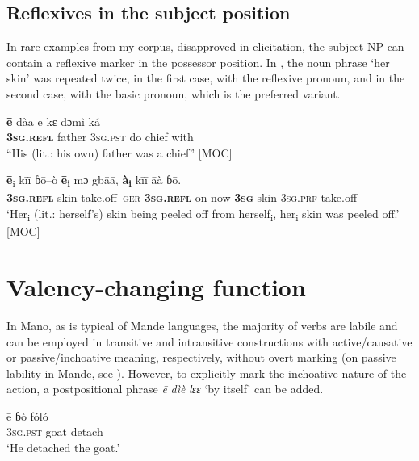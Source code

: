 \documentclass[output=paper]{langscibook}
\begin{document}
 
 \subsection{Reflexives in the subject position}\label{sec:Kachaturyan:5.4}

In rare examples from my corpus, disapproved in elicitation, the subject NP can contain a reflexive marker in the possessor position. In , the noun phrase ‘her skin’ was repeated twice, in the first case, with the reflexive pronoun, and in the second case, with the basic pronoun, which is the preferred variant.

\ea
    \label{ex:Kachaturyan:38} 
 \gll \textbf{ē}  dàā  ē  kɛ  dɔmì  ká\\
     \textbf{3\textsc{sg.refl}}  father  3\textsc{sg.pst}  do  chief  with\\
\glt “His (lit.: his own) father was a chief” [MOC]
\z

\ea
    \label{ex:Kachaturyan:39} 
 \gll \textbf{ē}\textsubscript{i}  kīī  ɓō–ò  \textbf{ē\textsubscript{i}}  mɔ  gbāā,  \textbf{à\textsubscript{i}}  kīī  āà  ɓō.\\
     \textbf{3\textsc{sg}}\textbf{.\textsc{refl}}  skin  take.off–\textsc{ger}  \textbf{3\textsc{sg}}\textbf{.\textsc{refl}}  on  now  \textbf{3\textsc{sg}}  skin  3\textsc{sg}.\textsc{prf}  take.off\\
\glt ‘Her\textsubscript{i} (lit.: herself’s) skin being peeled off from herself\textsubscript{i}, her\textsubscript{i} skin was peeled off.’ [MOC]
\z


 \section{Valency-changing function}\label{sec:Kachaturyan:6}

In Mano, as is typical of Mande languages, the majority of verbs are labile and can be employed in transitive and intransitive constructions with active/causative or passive/inchoative meaning, respectively, without overt marking (on passive lability in Mande, see \citealt{CobbinahLuepke2009}). However, to explicitly mark the inchoative nature of the action, a postpositional phrase \textit{ē} \textit{dìè} \textit{lɛɛ} ‘by itself’ can be added.


 \ea
    \label{ex:Kachaturyan:40} 
    \ea
    \label{ex:Kachaturyan:40a} 
\gll ē  ɓò  fóló\\
     3\textsc{sg.pst}  goat  detach\\
\glt ‘He detached the goat.’
\end{document}
